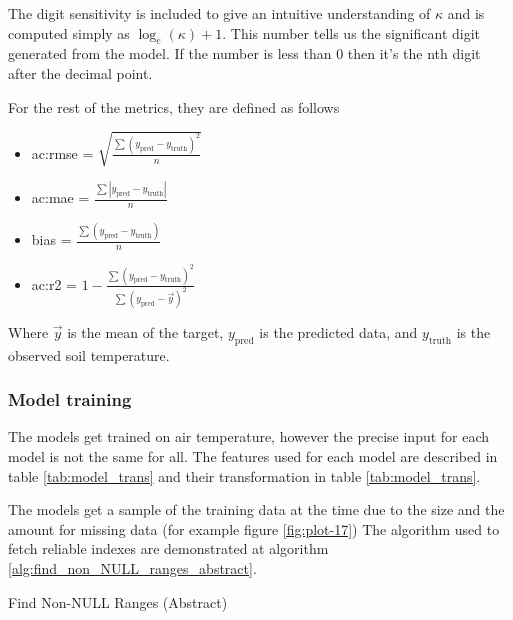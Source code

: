 The digit sensitivity is included to give an intuitive understanding of $\kappa$ and is computed simply as $\log_e(\kappa)+1$. This number tells us the significant digit generated from the model. If the number is less than 0 then it's the nth digit after the decimal point.

For the rest of the metrics, they are defined as follows
\begin{itemize}
	\item \gls{ac:rmse} = $\sqrt{\frac{\sum (y_{\text{pred}} - y_{\text{truth}})^2}{n}}$
	\item \gls{ac:mae} = $\frac{\sum \left| y_{\text{pred}} - y_{\text{truth}}\right|}{n}$
	\item bias = $\frac{\sum ( y_{\text{pred}} - y_{\text{truth}})}{n}$
	\item \gls{ac:r2} = $1-\frac{\sum (y_{\text{pred}} - y_{\text{truth}})^2}{\sum (y_{\text{pred}} - \vec{y})^2}$
\end{itemize}

Where $\vec{y}$ is the mean of the target, $y_{\text{pred}}$ is the predicted data, and $y_{\text{truth}}$ is the observed soil temperature.

\subsubsection{Model training}

The models get trained on air temperature, however the precise input for each model is not the same for all. The features used for each model are described in table \ref{tab:model_trans} and their transformation in table \ref{tab:model_trans}.

The models get a sample of the training data at the time due to the size and the amount for missing data (for example figure \ref{fig:plot-17}) The algorithm used to fetch reliable indexes are demonstrated at algorithm \ref{alg:find_non_NULL_ranges_abstract}.

\begin{algorithm}
	\caption{Find Non-NULL Ranges (Abstract)}
	\label{alg:find_non_NULL_ranges_abstract}
	
	
	\BlankLine
	
\end{algorithm}

